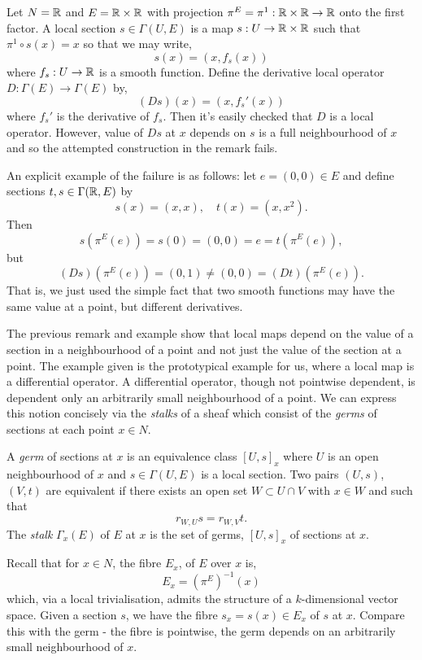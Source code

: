 \documentclass{amsart}
\begin{document}
\begin{example}
Let \(N = \mathbb{R}\) and \(E = \mathbb{R} \times \mathbb{R}\) with projection \(\pi^E = \pi^1 : \mathbb{R} \times \mathbb{R} \to \mathbb{R}\) onto the first factor. A local section \(s \in \Gamma(U, E)\) is a map \(s : U \to \mathbb{R} \times \mathbb{R}\) such that \(\pi^1 \circ s (x) = x\) so that we may write,
\[
s(x) = (x, f_s(x))
\]
where \(f_s : U \to \mathbb{R}\) is a smooth function. Define the derivative local operator \(D : \Gamma(E) \to \Gamma(E)\) by,
\[
(D s) (x) = (x, f_s'(x))
\]
where \(f_s'\) is the derivative of \(f_s\). Then it's easily checked that \(D\) is a local operator. However, value of \(D s\) at \(x\) depends on \(s\) is a full neighbourhood of \(x\) and so the attempted construction in the remark fails.

An explicit example of the failure is as follows: let \(e = (0, 0) \in E\) and define sections \(t,s \in \Gamma(\mathbb{R}, E)\) by
\[
s(x) = (x, x), \quad t(x) = (x, x^2).
\]
Then
\[
s(\pi^E(e)) = s(0) = (0,0) = e = t(\pi^E(e)),
\]
but
\[
(D s) (\pi^E(e)) = (0, 1) \ne (0, 0) = (D t) (\pi^E(e)).
\]
That is, we just used the simple fact that two smooth functions may have the same value at a point, but different derivatives.
\end{example}

The previous remark and example show that local maps depend on the value of a section in a neighbourhood of a point and not just the value of the section at a point. The example given is the prototypical example for us, where a local map is a differential operator. A differential operator, though not pointwise dependent, is dependent only an arbitrarily small neighbourhood of a point. We can express this notion concisely via the \emph{stalks} of a sheaf which consist of the \emph{germs} of sections at each point \(x \in N\).

\begin{defn}
A \emph{germ} of sections at \(x\) is an equivalence class \([U, s]_x\) where \(U\) is an open neighbourhood of \(x\) and \(s \in \Gamma(U, E)\) is a local section. Two pairs \((U, s)\), \((V, t)\) are equivalent if there exists an open set \(W \subset U \cap V\) with \(x \in W\) and such that
\[
r_{W, U} s = r_{W, V} t.
\]
The \emph{stalk} \(\Gamma_x(E)\) of \(E\) at \(x\) is the set of germs, \([U, s]_x\) of sections at \(x\).
\end{defn}

\begin{rem}
Recall that for \(x \in N\), the fibre \(E_x\), of \(E\) over \(x\) is,
\[
E_x = (\pi^E)^{-1} (x)
\]
which, via a local trivialisation, admits the structure of a \(k\)-dimensional vector space. Given a section \(s\), we have the fibre \(s_x = s(x) \in E_x\) of \(s\) at \(x\). Compare this with the germ - the fibre is pointwise, the germ depends on an arbitrarily small neighbourhood of \(x\).
\end{rem}
\end{document}
